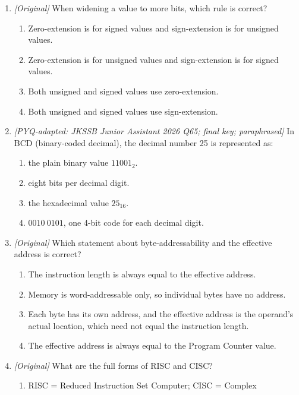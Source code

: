 \documentclass[11pt]{article}
\begin{document}
\begin{enumerate}[label=\textbf{Q\arabic*.}, leftmargin=*]
\begin{enumerate}[label=\Alph*.]
      sign.
  \end{enumerate}
\item \textit{[Original]} When widening a value to more bits, which rule is
correct?
  \begin{enumerate}[label=\Alph*.]
    \item Zero-extension is for signed values and sign-extension is for
      unsigned values.
    \item Zero-extension is for unsigned values and sign-extension is for
      signed values.
    \item Both unsigned and signed values use zero-extension.
    \item Both unsigned and signed values use sign-extension.
  \end{enumerate}
\item \textit{[PYQ-adapted: JKSSB Junior Assistant 2026 Q65; final key;
paraphrased]} In BCD (binary-coded decimal), the decimal number 25 is
represented as:
  \begin{enumerate}[label=\Alph*.]
    \item the plain binary value $11001_2$.
    \item eight bits per decimal digit.
    \item the hexadecimal value $25_{16}$.
    \item $0010\ 0101$, one 4-bit code for each decimal digit.
  \end{enumerate}
\item \textit{[Original]} Which statement about byte-addressability and the
effective address is correct?
  \begin{enumerate}[label=\Alph*.]
    \item The instruction length is always equal to the effective address.
    \item Memory is word-addressable only, so individual bytes have no
      address.
    \item Each byte has its own address, and the effective address is the
      operand's actual location, which need not equal the instruction
      length.
    \item The effective address is always equal to the Program Counter value.
  \end{enumerate}
\item \textit{[Original]} What are the full forms of RISC and CISC?
  \begin{enumerate}[label=\Alph*.]
    \item RISC = Reduced Instruction Set Computer; CISC = Complex

\end{enumerate}
\end{enumerate}
\end{document}

